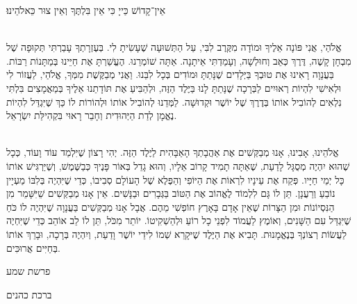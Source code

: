 \documentclass[14pt, article, extrafontsizes, twopage, a4paper]{memoir}
\begin{document}
אֵין־קָדוֹשׁ כַּייָ כִּי אֵין בִּלְתֶּךָ וְאֵין צוּר כֵּאלֹהֵינוּ׃

\\
אֱלֹהַי,
אֲנִי פּוֹנָה אֵלֶיךָ וּמוֹדָה מִקֶּרֶב לִבִּי,
עַל הַתְּשׁוּעָה שֶׁעָשִׂיתָ לִי.
בְּעֶזְרָתְךָ עָבַרְתִּי תְּקוּפָה שֶׁל מִבְחָן קָשֶׁה,
דֶּרֶךְ כְּאֵב וְחוּלְשָׁה, וְעָמַדְתִּי אֵיתָנָה.
אַתָּה שׁוֹמְרֵנוּ.
הֶעֱשַׁרְתָּ אֶת חַיֵּינוּ בְּמַתָּנוֹת רַבּוֹת.
בַּעֲנָוָה רָאִינוּ אֶת טוּבְךָ בַּיְּלָדִים שֶׁנָּתַתָּ
וּמוֹדִים בְּכָל לִבֵּנוּ.
וַאֲנִי מְבַקֶּשֶׁת מִמְּךָ, אֱלֹהַי,
לַעֲזוֹר לִי וּלְאִישִׁי
לִהְיוֹת רְאוּיִים לַבְּרָכָה
שֶׁנָּתַתָּ לָנוּ בַּיֶּלֶד הַזֶּה,
וּלְהַבִּיעַ אֶת תּוֹדָתֵנוּ אֵלֶיךָ
בְּמַאֲמָצִים בִּלְתִּי נִלְאִים לְהוֹבִיל אוֹתוֹ
בְּדֶרֶךְ שֶׁל יוֹשֶׁר וּקְדוּשָׁה.
לַמְּדֵנוּ לְהוֹבִיל אוֹתוֹ וּלְהוֹרוֹת לוֹ
כַּךְ שֶׁיִּגְדַּל לִהְיוֹת נֶאֱמָן לְדַת הַיְּהוּדִית 
וְחָבֵר רָאוּי בִּקְהִילַּת יִשְׂרָאֵל.

\\
אֱלֹהֵינוּ, אָבִינוּ,
אָנוּ מְבַקְּשִׁים אֶת אַהֲבָתְךָ הָאַבָּהִית לַיֶּלֶד הַזֶּה.
יְהִי רָצוֹן שֶׁיִּלְמַד עוֹד וָעוֹד,
כְּכָל שֶׁהוּא יִהְיֶה מְסֻגָּל לָדַעַת,
שֶׁאַתָּה תָמִיד קָרוֹב אֵלָיו,
וְהוּא גָדֵל בְּאוֹר פָּנֶיךָ כְּבַשֶּׁמֶשׁ,
וְשֶׁיַּרְגִּישׁ אוֹתוֹ כָּל יְמֵי חַיָּיו.
פְּקַח אֶת עֵינָיו לִרְאוֹת אֶת הַיּוֹפִי וְהַפֶּלֶא שֶׁל הָעוֹלָם סְבִיבוֹ,
כְּדֵי שֶׁיִּהְיֶה בְּלִבּוֹ מַעְיָין נוֹבֵעַ וְרַעֲנָן.
תֵּן לוֹ גָּם לִלְמוֹד לֶאֱהוֹב אֶת הַטּוֹב בַּגְּבָרִים וּבַנָּשִׁים.
אֵין אָנוּ מְבַקְּשִׁים שֵׁיִּשָּׁמֵר מִן הַנִּסְיוֹנוֹת וּמִן הַצָּרוֹת
שֶׁאֵין אָדָם בָּאָרֶץ חוֹפְשִׁי מֵהֶם.
אֲבָל אָנוּ מְבַקְּשִׁים בַּעֲנָוָה שֶׁיִּהְיֶה לוֹ כֹּחַ שֶׁיִּגְדַּל עִם הַשָּׁנִים,
וְאוֹמֶץ לַעֲמוֹד לִפְנֵי כָל רוֹעַ וּלְהַשְׁקִיטוֹ.
יוֹתֵר מִכֹּל, תֵּן לוֹ לֵב אוֹהֵב כְּדֵי שֶׁיִּחְיֶה לַעֲשׂוֹת רְצוֹנְךָ בְּנֶאֱמָנוּת.
תָּבִיא אֶת הַיֶּלֶד שֶׁיּקָרֵא שְׁמוֹ 
לִידֵי יוֹשֶׁר וָדַעַת,
וְיִהְיֶה בְּרָכָה,
וּבָרֵךְ אוֹתוֹ בְּחַיִּים אֲרוּכִּים.

{\centering\larger[2]
  פרשת שמע

 ברכת כהנים

}
\end{document}
